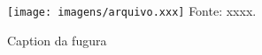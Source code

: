 \begin{figure}[H]
\centering
\caption{Caption da fugura}
\label{fig:label}
\vspace{-0.2cm}
\texttt{[image: imagens/arquivo.xxx]}
\footnotesize{Fonte: xxxx.}
\end{figure}
